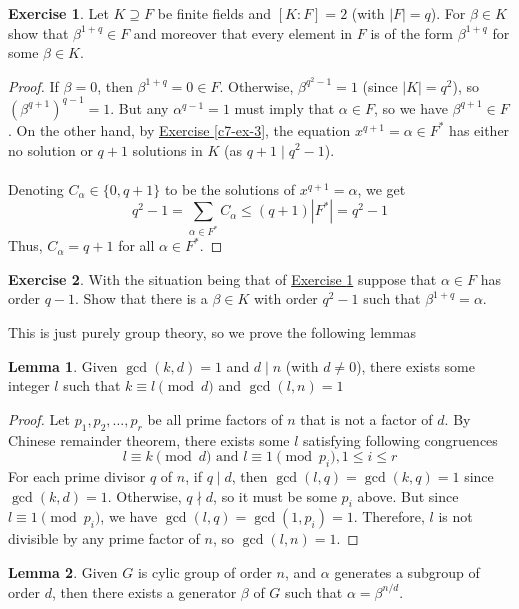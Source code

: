 \documentclass{article}
\theoremstyle{definition}
\newtheorem{exercise}{Exercise}
\newtheorem{lemma}{Lemma}[exercise]
\begin{document}
\newpage

\begin{exercise} \label{c7-ex-10}
Let $K \supseteq F$ be finite fields and $[K : F] = 2$ (with $|F| = q$). For $\beta \in K$ show that $\beta^{1 + q} \in F$ and moreover that every element in $F$ is of the form $\beta^{1 + q}$ for some $\beta \in K$.
\end{exercise}
\begin{proof}
If $\beta = 0$, then $\beta^{1 + q} = 0 \in F$. Otherwise, $\beta^{q^2 - 1} = 1$ (since $|K| = q^2$), so $(\beta^{q + 1})^{q - 1} = 1$. But any $\alpha^{q - 1} = 1$ must imply that $\alpha \in F$, so we have $\beta^{q + 1} \in F$. On the other hand, by \hyperref[c7-ex-3]{Exercise \ref*{c7-ex-3}}, the equation $x^{q + 1} = \alpha \in F^*$ has either no solution or $q + 1$ solutions in $K$ (as $q + 1 \mid q^2 - 1$).
\\
\\
Denoting $C_\alpha \in \{ 0, q + 1 \}$ to be the solutions of $x^{q + 1} = \alpha$, we get
$$q^2 - 1 = \sum_{\alpha \in F^*} C_\alpha \leq (q + 1) |F^*| = q^2 - 1$$
Thus, $C_\alpha = q + 1$ for all $\alpha \in F^*$.
\end{proof}
\begin{exercise}
With the situation being that of \hyperref[c7-ex-10]{Exercise \ref*{c7-ex-10}} suppose that $\alpha \in F$ has order $q - 1$. Show that there is a $\beta \in K$ with order $q^2 - 1$ such that $\beta^{1 + q} = \alpha$.
\end{exercise}
This is just purely group theory, so we prove the following lemmas
\begin{lemma}
Given $\gcd(k, d) = 1$ and $d \mid n$ (with $d \neq 0$), there exists some integer $l$ such that $k \equiv l \pmod{d}$ and $\gcd(l, n) = 1$
\end{lemma}
\begin{proof}
Let $p_1, p_2, \hdots, p_r$ be all prime factors of $n$ that is not a factor of $d$. By Chinese remainder theorem, there exists some $l$ satisfying following congruences
$$l \equiv k \pmod{d} \mbox{ and } l \equiv 1 \pmod{p_i}, 1 \leq i \leq r$$
For each prime divisor $q$ of $n$, if $q \mid d$, then $\gcd(l, q) = \gcd(k, q) = 1$ since $\gcd(k, d) = 1$. Otherwise, $q \nmid d$, so it must be some $p_i$ above. But since $l \equiv 1 \pmod{p_i}$, we have $\gcd(l, q) = \gcd(1, p_i) = 1$. Therefore, $l$ is not divisible by any prime factor of $n$, so $\gcd(l, n) = 1$.
\end{proof}
\begin{lemma}
Given $G$ is cylic group of order $n$, and $\alpha$ generates a subgroup of order $d$, then there exists a generator $\beta$ of $G$ such that $\alpha = \beta^{n/d}$.
\end{lemma}
\end{document}
